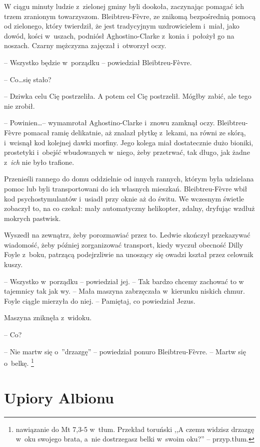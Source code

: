 \documentclass[oneside,polish,11pt,sfheadings]{mwbk}
\begin{document}
W ciągu minuty ludzie z~zielonej gminy byli dookoła, zaczynając pomagać
ich trzem zranionym towarzyszom. Bleibtreu-Fèvre, ze znikomą
bezpośrednią pomocą od zielonego, który twierdził, że jest tradycyjnym
uzdrowicielem i~miał, jako dowód, kości w~uszach, podniósł
Aghostino-Clarke z~konia i~położył go na noszach. Czarny mężczyzna
zajęczał i~otworzył oczy.

-- Wszystko będzie w~porządku -- powiedział Bleibtreu-Fèvre.

-- Co\ldots się stało?

-- Dziwka celu Cię postrzeliła. A potem cel Cię postrzelił. Mógłby zabić,
ale tego nie zrobił.

-- Powinien\ldots -- wymamrotał Aghostino-Clarke i~znowu zamknął oczy.
Bleibtreu-Fèvre pomacał ramię delikatnie, aż znalazł płytkę z~lekami, na
równi ze skórą, i~wcisnął kod kolejnej dawki morfiny. Jego kolega miał
dostatecznie dużo bioniki, prostetyki i~obejść wbudowanych w~niego, żeby
przetrwać, tak długo, jak żadne z~\emph{ich} nie było trafione.

Przenieśli rannego do domu oddzielnie od innych rannych, którym była
udzielana pomoc lub byli transportowani do ich własnych mieszkań.
Bleibtreu-Fèvre wbił kod psychostymulantów i~usiadł przy oknie aż do
świtu. We wczesnym świetle zobaczył to, na co czekał: mały automatyczny
helikopter, zdalny, dryfując wzdłuż mokrych pastwisk.

Wyszedł na zewnątrz, żeby porozmawiać przez to. Ledwie skończył
przekazywać wiadomość, żeby później zorganizować transport, kiedy wyczuł
obecność Dilly Foyle z~boku, patrzącą podejrzliwie na unoszący się
owadzi kształ przez celownik kuszy.

-- Wszystko w~porządku -- powiedział jej. -- Tak bardzo chcemy zachować to
w tajemnicy tak jak wy. -- Mała maszyna zabrzęczała w~kierunku niskich
chmur. Foyle ciągle mierzyła do niej. -- Pamiętaj, co powiedział Jezus.

Maszyna zniknęła z~widoku.

-- Co?

-- Nie martw się o~''drzazgę'' -- powiedział ponuro Bleibtreu-Fèvre. -- Martw
się o~belkę. \footnote{nawiązanie do Mt 7,3-5 w~tłum. Przekład toruński ,,A czemu widzisz
drzazgę w~oku swojego brata, a~nie dostrzegasz belki w~swoim oku?'' -- przyp.tłum.}

\chapter{Upiory Albionu}
\end{document}
